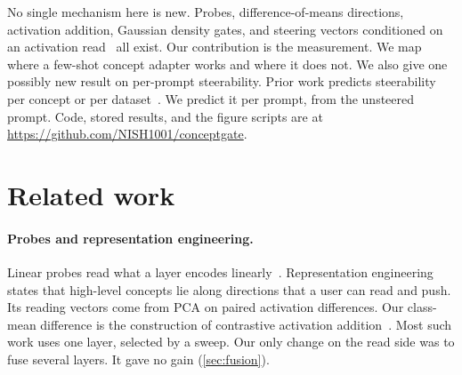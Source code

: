 \documentclass[11pt]{article}
\begin{document}
No single mechanism here is new. Probes, difference-of-means directions, activation addition, Gaussian
density gates, and steering vectors conditioned on an activation read~\citep{lee2024cast,ferrando2025dsas}
all exist. Our contribution is the measurement. We map where a few-shot concept adapter works and where it
does not. We also give one possibly new result on per-prompt steerability. Prior work predicts
steerability per concept or per dataset~\citep{braun2025unreliability,bhattarai2026signatures,billa2026where}.
We predict it per prompt, from the unsteered prompt. Code, stored results, and the figure scripts are at
\url{https://github.com/NISH1001/conceptgate}.

\section{Related work}
\label{sec:related}

\paragraph{Probes and representation engineering.}
Linear probes read what a layer encodes linearly~\citep{alain2016probes}. Representation
engineering~\citep{zou2023repe} states that high-level concepts lie along directions that a user can read
and push. Its reading vectors come from PCA on paired activation differences. Our class-mean difference is
the construction of contrastive activation addition~\citep{panickssery2023caa}. Most such work uses one
layer, selected by a sweep. Our only change on the read side was to fuse several layers. It gave no gain
(\cref{sec:fusion}).
\end{document}
